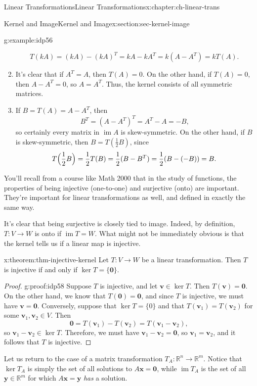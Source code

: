 \documentclass[oneside,10pt,]{book}
\numberwithin{equation}{section}
\newcommand{\R}{\mathbb{R}}
\newcommand{\im}{\operatorname{im}}
\newcommand{\vv}{\mathbf{v}}
\newcommand{\xx}{\mathbf{x}}
\newcommand{\yy}{\mathbf{y}}
\begin{document}
\begin{chapterptx}{Linear Transformations}{}{Linear Transformations}{}{}{x:chapter:ch-linear-trans}
\begin{sectionptx}{Kernel and Image}{}{Kernel and Image}{}{}{x:section:sec-kernel-image}
\begin{example}{}{g:example:idp56}
\begin{enumerate}
\begin{equation*}
T(kA) = (kA) - (kA)^T = kA-kA^T = k(A-A^T) = kT(A)\text{.}
\end{equation*}
%
\item{}It's clear that if \(A^T=A\), then \(T(A)=0\). On the other hand, if \(T(A)=0\), then \(A-A^T=0\), so \(A=A^T\). Thus, the kernel consists of all symmetric matrices.%
\item{}If \(B=T(A)=A-A^T\), then%
\begin{equation*}
B^T = (A-A^T)^T = A^T-A = -B\text{,}
\end{equation*}
so certainly every matrix in \(\im A\) is skew-symmetric. On the other hand, if \(B\) is skew-symmetric, then \(B=T(\frac12 B)\), since%
\begin{equation*}
T\Bigl(\frac12 B\Bigr) = \frac12 T(B) = \frac12(B-B^T) = \frac12(B-(-B))= B\text{.}
\end{equation*}
%
\end{enumerate}
%
\end{example}
You'll recall from a course like Math 2000 that in the study of functions, the properties of being injective (one-to-one) and surjective (onto) are important. They're important for linear transformations as well, and defined in exactly the same way.%
\par
It's clear that being surjective is closely tied to image. Indeed, by definition, \(T:V\to W\) is onto if \(\im T = W\). What might not be immediately obvious is that the kernel tells us if a linear map is injective.%
\begin{theorem}{}{}{x:theorem:thm-injective-kernel}%
Let \(T:V\to W\) be a linear transformation. Then \(T\) is injective if and only if \(\ker T = \{\mathbf{0}\}\).%
\end{theorem}
\begin{proof}{}{g:proof:idp58}
Suppose \(T\) is injective, and let \(\vv\in \ker T\). Then \(T(\vv)=\mathbf{0}\). On the other hand, we know that \(T(\mathbf{0})=\mathbf{0}\), and since \(T\) is injective, we must have \(\vv=\mathbf{0}\). Conversely, suppose that \(\ker T = \{0\}\) and that \(T(\vv_1)=T(\vv_2)\) for some \(\vv_1,\vv_2\in V\). Then%
\begin{equation*}
\mathbf{0} = T(\vv_1)-T(\vv_2) = T(\vv_1-\vv_2)\text{,}
\end{equation*}
so \(\vv_1-\vv_2\in \ker T\). Therefore, we must have \(\vv_1-\vv_2=\mathbf{0}\), so \(\vv_1=\vv_2\), and it follows that \(T\) is injective.%
\end{proof}
Let us return to the case of a matrix transformation \(T_A:\R^n\to \R^m\). Notice that \(\ker T_A\) is simply the set of all solutions to \(A\xx=\mathbf{0}\), while \(\im T_A\) is the set of all \(\yy\in\R^m\) for which \(A\xx=\yy\) \emph{has} a solution.%

\end{sectionptx}
\end{chapterptx}
\end{document}
